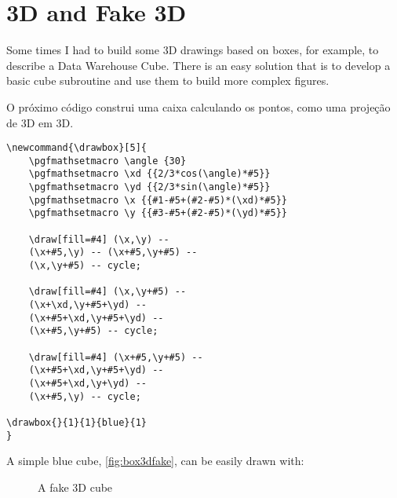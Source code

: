 \chapter{3D and Fake 3D}

Some times I had to build some 3D drawings based on boxes, for example, to describe a Data Warehouse Cube. There is an easy solution that is to develop a basic cube subroutine and use them to build more complex figures.

O próximo código construi uma caixa calculando os pontos, como uma projeção de 3D em 3D.

\begin{lstlisting}[style=myLateX,caption=Cubo azul em Fake 3D]
\newcommand{\drawbox}[5]{
    \pgfmathsetmacro \angle {30}
    \pgfmathsetmacro \xd {{2/3*cos(\angle)*#5}}
    \pgfmathsetmacro \yd {{2/3*sin(\angle)*#5}}
    \pgfmathsetmacro \x {{#1-#5+(#2-#5)*(\xd)*#5}}
    \pgfmathsetmacro \y {{#3-#5+(#2-#5)*(\yd)*#5}}

    \draw[fill=#4] (\x,\y) --
    (\x+#5,\y) -- (\x+#5,\y+#5) --
    (\x,\y+#5) -- cycle;
    
    \draw[fill=#4] (\x,\y+#5) -- 
    (\x+\xd,\y+#5+\yd) -- 
    (\x+#5+\xd,\y+#5+\yd) --
    (\x+#5,\y+#5) -- cycle;
    
    \draw[fill=#4] (\x+#5,\y+#5) --
    (\x+#5+\xd,\y+#5+\yd) --
    (\x+#5+\xd,\y+\yd) -- 
    (\x+#5,\y) -- cycle;

\drawbox{}{1}{1}{blue}{1}  
}    
\end{lstlisting}

\newcommand{\drawbox}[5]{
    \pgfmathsetmacro \angle {30}
    \pgfmathsetmacro \xd {{2/3*cos(\angle)*#5}}
    \pgfmathsetmacro \yd {{2/3*sin(\angle)*#5}}
    \pgfmathsetmacro \x {{#1-#5+(#2-#5)*(\xd)*#5}}
    \pgfmathsetmacro \y {{#3-#5+(#2-#5)*(\yd)*#5}}

    \draw[fill=#4] (\x,\y) -- (\x+#5,\y) -- (\x+#5,\y+#5) -- (\x,\y+#5) -- cycle;
    
    \draw[fill=#4] (\x,\y+#5) -- (\x+\xd,\y+#5+\yd) -- (\x+#5+\xd,\y+#5+\yd) -- (\x+#5,\y+#5) -- cycle;
    
    \draw[fill=#4] (\x+#5,\y+#5) -- (\x+#5+\xd,\y+#5+\yd) -- (\x+#5+\xd,\y+\yd) -- (\x+#5,\y) -- cycle;
}


A simple blue cube, \autoref{fig:box3dfake}, can be easily drawn with:



\begin{figure}[hbt]
    \centering
    \caption{A fake 3D cube}
    \label{fig:box3dfake}
\end{figure}


